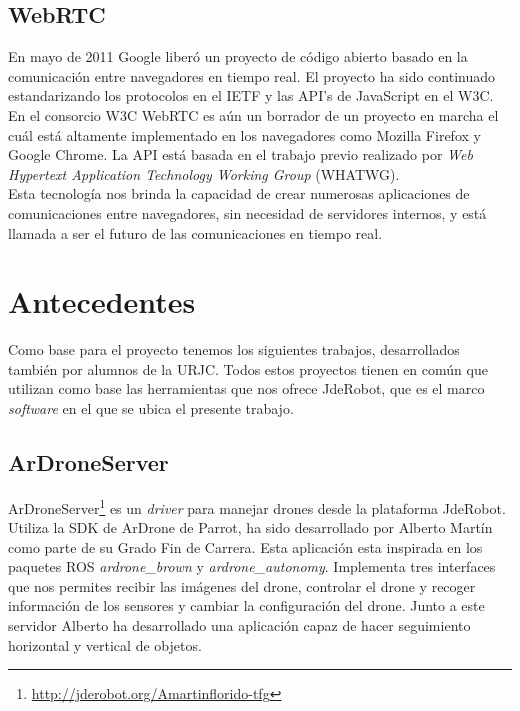 \subsection{WebRTC}

En mayo de 2011 Google liberó un proyecto de código abierto basado en la comunicación entre navegadores en tiempo real. El proyecto ha sido continuado estandarizando los protocolos en el IETF y las API's de JavaScript en el W3C. En el consorcio W3C WebRTC es aún un borrador de un proyecto en marcha el cuál está altamente implementado en los navegadores como Mozilla Firefox y Google Chrome. La API está basada en el trabajo previo realizado por \emph{Web Hypertext Application Technology Working Group} (WHATWG).\\

Esta tecnología nos brinda la capacidad de crear numerosas aplicaciones de comunicaciones entre navegadores, sin necesidad de servidores internos, y está llamada a ser el futuro de las comunicaciones en tiempo real.\\


\section{Antecedentes}

Como base para el proyecto tenemos los siguientes trabajos, desarrollados también por alumnos de la URJC. Todos estos proyectos tienen en común que utilizan como base las herramientas que nos ofrece JdeRobot, que es el marco \emph{software} en el que se ubica el presente trabajo.\\

\subsection{ArDroneServer}

ArDroneServer\footnote{\url{http://jderobot.org/Amartinflorido-tfg}}\cite{ArDroneServer} es un \emph{driver} para manejar drones desde la plataforma JdeRobot. Utiliza la SDK de ArDrone de Parrot, ha sido desarrollado por Alberto Martín como parte de su Grado Fin de Carrera. Esta aplicación esta inspirada en los paquetes ROS \emph{ardrone\_brown} y \emph{ardrone\_autonomy}. Implementa tres interfaces que nos permites recibir las imágenes del drone, controlar el drone y recoger información de los sensores y cambiar la configuración del drone. Junto a este servidor Alberto ha desarrollado una aplicación capaz de hacer seguimiento horizontal y vertical de objetos.\\

